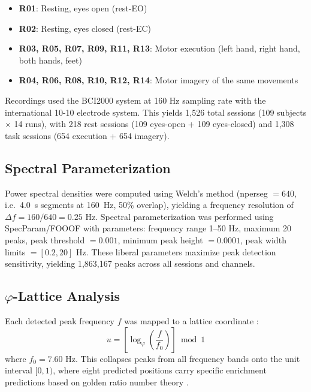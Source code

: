 \documentclass[11pt,a4paper]{article}
\newcommand{\phisym}{\varphi}
\newcommand{\fzero}{f_0}
\begin{document}
\begin{itemize}
    \item \textbf{R01}: Resting, eyes open (rest-EO)
    \item \textbf{R02}: Resting, eyes closed (rest-EC)
    \item \textbf{R03, R05, R07, R09, R11, R13}: Motor execution (left hand, right hand, both hands, feet)
    \item \textbf{R04, R06, R08, R10, R12, R14}: Motor imagery of the same movements
\end{itemize}

Recordings used the BCI2000 system at 160 Hz sampling rate with the international 10-10 electrode system. This yields 1,526 total sessions (109 subjects $\times$ 14 runs), with 218 rest sessions (109 eyes-open + 109 eyes-closed) and 1,308 task sessions (654 execution + 654 imagery).

\subsection{Spectral Parameterization}
\label{sec:fooof}

Power spectral densities were computed using Welch's method (nperseg $= 640$, i.e.\ 4.0~s segments at 160~Hz, 50\% overlap), yielding a frequency resolution of $\Delta f = 160/640 = 0.25$ Hz. Spectral parameterization was performed using SpecParam/FOOOF \parencite{donoghue2020fooof} with parameters: frequency range 1--50 Hz, maximum 20 peaks, peak threshold $= 0.001$, minimum peak height $= 0.0001$, peak width limits $= [0.2, 20]$ Hz. These liberal parameters maximize peak detection sensitivity, yielding 1,863,167 peaks across all sessions and channels.

\subsection{$\phisym$-Lattice Analysis}
\label{sec:lattice}

Each detected peak frequency $f$ was mapped to a lattice coordinate \parencite{lacy2026golden}:
\begin{equation}
    u = \left[\log_\phisym\left(\frac{f}{\fzero}\right)\right] \bmod 1
    \label{eq:lattice}
\end{equation}
where $\fzero = 7.60$ Hz. This collapses peaks from all frequency bands onto the unit interval $[0, 1)$, where eight predicted positions carry specific enrichment predictions based on golden ratio number theory \parencite{pletzer2010golden, hardy1979introduction}.
\end{document}
